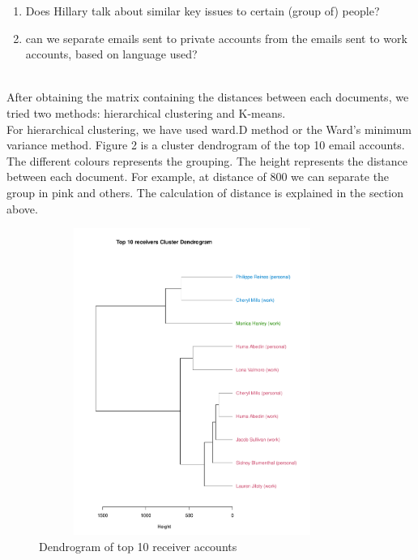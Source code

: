 \begin{enumerate}
  \item Does Hillary talk about similar key issues to certain (group of) people?
  \item can we separate emails sent to private accounts from the emails sent to work accounts, based on language used?
\end{enumerate}
\\
After obtaining the matrix containing the distances between each documents, we tried two methods: hierarchical clustering and K-means. 
\\
For hierarchical clustering, we have used ward.D method or the Ward's minimum variance method. Figure 2 is a cluster dendrogram of the top 10 email accounts. The different colours represents the grouping. The height represents the distance between each document. For example, at distance of 800 we can separate the group in pink and others. The calculation of distance is explained in the section above.
\begin{figure}[h!]
    \centering
    \includegraphics[width=10cm,height=10cm]
    {daitong_and_yihe/clusterp.pdf}
    \caption{Dendrogram of top 10 receiver accounts}
\end{figure}

